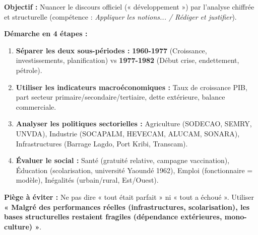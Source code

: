 \documentclass[11pt]{article}
\begin{document}
\begin{methode}
\textbf{Objectif :} Nuancer le discours officiel (« développement ») par l'analyse chiffrée et structurelle (compétence : \emph{Appliquer les notions... / Rédiger et justifier}).
\par
\textbf{Démarche en 4 étapes :}
\begin{enumerate}
    \item \textbf{Séparer les deux sous-périodes :} \textbf{1960-1977} (Croissance, investissements, planification) vs \textbf{1977-1982} (Début crise, endettement, pétrole).
    \item \textbf{Utiliser les indicateurs macroéconomiques :} Taux de croissance PIB, part secteur primaire/secondaire/tertiaire, dette extérieure, balance commerciale.
    \item \textbf{Analyser les politiques sectorielles :} Agriculture (SODECAO, SEMRY, UNVDA), Industrie (SOCAPALM, HEVECAM, ALUCAM, SONARA), Infrastructures (Barrage Lagdo, Port Kribi, Transcam).
    \item \textbf{Évaluer le social :} Santé (gratuité relative, campagne vaccination), Éducation (scolarisation, université Yaoundé 1962), Emploi (fonctionnaire = modèle), Inégalités (urbain/rural, Est/Ouest).
\end{enumerate}
\textbf{Piège à éviter :} Ne pas dire « tout était parfait » ni « tout a échoué ». Utiliser \textbf{« Malgré des performances réelles (infrastructures, scolarisation), les bases structurelles restaient fragiles (dépendance extérieures, mono-culture) »}.
\end{methode}
\end{document}
